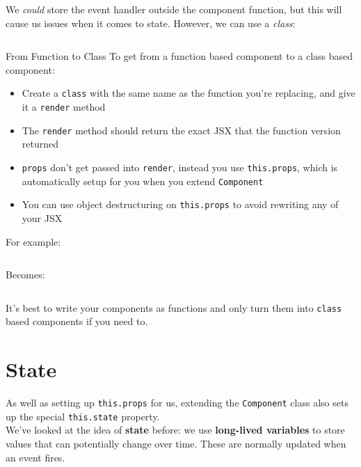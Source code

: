 We \textit{could} store the event handler outside the component function, but this will cause us issues when it comes to state. However, we can use a \textit{class}:

\inputminted{jsx}{02/figures/01/02-class-component.jsx}


\begin{infobox}{From Function to Class}
    To get from a function based component to a class based component:

    \begin{itemize}
        \item Create a \texttt{class} with the same name as the function you're replacing, and give it a \texttt{render} method
        \item The \texttt{render} method should return the exact JSX that the function version returned
        \item \texttt{props} don't get passed into \texttt{render}, instead you use \texttt{this.props}, which is automatically setup for you when you extend \texttt{Component}
        \item You can use object destructuring on \texttt{this.props} to avoid rewriting any of your JSX
    \end{itemize}

    For example:

    \inputminted{jsx}{02/figures/01/03-function-to-class-func.jsx}

    Becomes:

    \inputminted{jsx}{02/figures/01/04-function-to-class-class.jsx}

    It's best to write your components as functions and only turn them into \texttt{class} based components if you need to.
\end{infobox}


\pagebreak


\section{State}

As well as setting up \texttt{this.props} for us, extending the \texttt{Component} class also sets up the special \texttt{this.state} property.
\\

We've looked at the idea of \textbf{state} before: we use \textbf{long-lived variables} to store values that can potentially change over time. These are normally updated when an event fires.
\\

